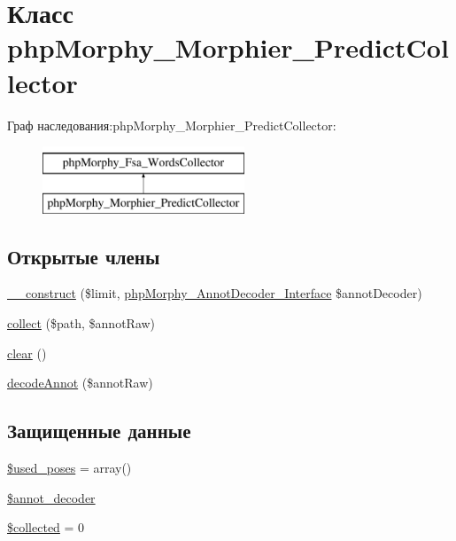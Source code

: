 \hypertarget{classphpMorphy__Morphier__PredictCollector}{
\section{Класс phpMorphy\_\-Morphier\_\-PredictCollector}
\label{classphpMorphy__Morphier__PredictCollector}
}
Граф наследования:phpMorphy\_\-Morphier\_\-PredictCollector:\begin{figure}[H]
\begin{center}
\leavevmode
\includegraphics[height=2.000000cm]{classphpMorphy__Morphier__PredictCollector}
\end{center}
\end{figure}
\subsection*{Открытые члены}
\begin{DoxyCompactItemize}
\item 
\hyperlink{classphpMorphy__Morphier__PredictCollector_a9ee2d85a54088edf617afc615d5594d0}{\_\-\_\-construct} (\$limit, \hyperlink{interfacephpMorphy__AnnotDecoder__Interface}{phpMorphy\_\-AnnotDecoder\_\-Interface} \$annotDecoder)
\item 
\hyperlink{classphpMorphy__Morphier__PredictCollector_a3b134f3d4fabafd5228fb99bd35d3f74}{collect} (\$path, \$annotRaw)
\item 
\hyperlink{classphpMorphy__Morphier__PredictCollector_a2f86a27174eb45dbfe2bb953f6ab3bef}{clear} ()
\item 
\hyperlink{classphpMorphy__Morphier__PredictCollector_acd930f12235265e531133736288defd3}{decodeAnnot} (\$annotRaw)
\end{DoxyCompactItemize}
\subsection*{Защищенные данные}
\begin{DoxyCompactItemize}
\item 
\hyperlink{classphpMorphy__Morphier__PredictCollector_a13da18ecdc4bbb28c020a2a9d7e27c22}{\$used\_\-poses} = array()
\item 
\hyperlink{classphpMorphy__Morphier__PredictCollector_a2736fca13aacb2d6f3d7ed2acb63554e}{\$annot\_\-decoder}
\item 
\hyperlink{classphpMorphy__Morphier__PredictCollector_a04ce1567c2ee6574c150847b4d68af84}{\$collected} = 0
\end{DoxyCompactItemize}


